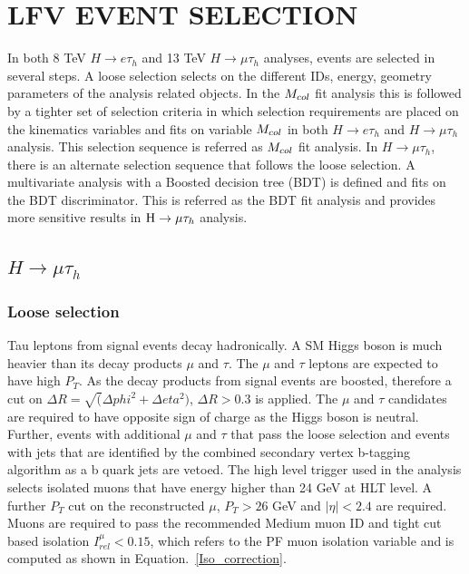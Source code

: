 

\chapter{LFV EVENT SELECTION}
In both 8 TeV $H\rightarrow e\tau_h$ and 13 TeV $H\rightarrow\mu\tau_h$ analyses, events are selected in several steps. A loose selection selects on the different IDs, energy, geometry parameters of the analysis related objects. In the $M_{col}$ fit analysis this is followed by a tighter set of selection criteria in which selection requirements are placed on the kinematics variables and fits on variable $M_{col}$ in both  $H\rightarrow e\tau_h$ and $H\rightarrow\mu\tau_h$ analysis. This selection sequence is referred as $M_{col}$ fit analysis. In $H\rightarrow\mu\tau_h$, there is an alternate selection sequence that follows the loose selection. A multivariate analysis with a Boosted decision tree (BDT) is defined and fits on the BDT discriminator. This is referred as the BDT fit analysis and provides more sensitive results in $\mathrm{H}\to \mu\tau_{h}$ analysis. 



\section{\texorpdfstring{$H\rightarrow\mu\tau_h$}{Lg}}
\subsection{Loose selection}
Tau leptons from signal events decay hadronically. A SM Higgs boson is much heavier than its decay products $\mu$ and $\tau$. The $\mu$ and $\tau$ leptons are expected to have high $P_{T}$. As the decay products from signal events are boosted, therefore a cut on $\Delta R=\sqrt(\Delta phi^{2}+\Delta eta^{2})$, $\Delta R>0.3$ is applied. The $\mu$ and $\tau$ candidates are required to have opposite sign of charge as the Higgs boson is neutral. Further, events with additional $\mu$ and $\tau$ that pass the loose selection and events with jets that are identified by the combined secondary vertex b-tagging algorithm \cite{btag_ago} as a b quark jets are vetoed. The high level trigger used in the analysis selects isolated muons that have energy higher than 24 GeV at HLT level. A further $P_{T}$ cut on the reconstructed $\mu$,  $P_{T}>26$ GeV and $|\eta|<2.4$ are required. Muons are required to pass the recommended Medium muon ID and tight cut based isolation $I^{\mu}_{rel}<0.15$, which refers to the PF muon isolation variable and is computed as shown in Equation.~\ref{Iso_correction}. %

